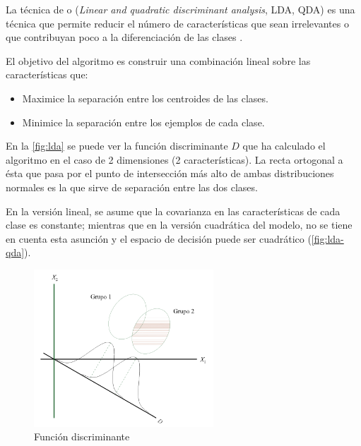 La técnica de  o  (\emph{Linear and quadratic discriminant analysis}, LDA, QDA) es una técnica que permite reducir el número de características que sean irrelevantes o que contribuyan poco a la diferenciación de las clases \citep[Discriminant function analysis]{wikipedia-en}.

El objetivo del algoritmo es construir una combinación lineal sobre las características que:
\begin{itemize}
\item Maximice la separación entre los centroides de las clases.
\item Minimice la separación entre los ejemplos de cada clase.
\end{itemize}

En la \autoref{fig:lda} se puede ver la función discriminante $D$ que ha calculado el algoritmo en el caso de 2 dimensiones (2 características). La recta ortogonal a ésta que pasa por el punto de intersección más alto de ambas distribuciones normales es la que sirve de separación entre las dos clases.

En la versión lineal, se asume que la covarianza en las características de cada clase es constante; mientras que en la versión cuadrática del modelo, no se tiene en cuenta esta asunción y el espacio de decisión puede ser cuadrático (\autoref{fig:lda-qda}).

\begin{figure}[htbp]
\centering
\includegraphics[width=0.6\textwidth]{lda}
\caption[Función discriminante]{Función discriminante \citep{Ruiz2001}}
\label{fig:lda}
\end{figure}


